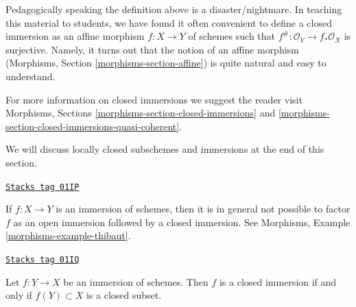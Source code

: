 \medskip\noindent
Pedagogically speaking the definition above is a disaster/nightmare.
In teaching this material to students, we have found it often
convenient to define a closed immersion as an affine morphism
$f : X \to Y$ of schemes such that $f^\# : \mathcal{O}_Y \to f_*\mathcal{O}_X$
is surjective. Namely, it turns out that the notion of an affine
morphism (Morphisms, Section \ref{morphisms-section-affine})
is quite natural and easy to understand.

\medskip\noindent
For more information on closed immersions we suggest the reader visit
Morphisms, Sections \ref{morphisms-section-closed-immersions} and
\ref{morphisms-section-closed-immersions-quasi-coherent}.

\medskip\noindent
We will discuss locally closed subschemes and immersions
at the end of this section.

\begin{remark}
\label{schemes-remark-not-reverse-open-closed}
\href{https://stacks.math.columbia.edu/tag/01IP}{\texttt{Stacks tag 01IP}}

If $f : X \to Y$ is an immersion of schemes, then it is in general
not possible to factor $f$ as an open immersion followed
by a closed immersion. See Morphisms, Example \ref{morphisms-example-thibaut}.
\end{remark}

\begin{lemma}
\label{schemes-lemma-immersion-when-closed}
\href{https://stacks.math.columbia.edu/tag/01IQ}{\texttt{Stacks tag 01IQ}}

Let $f : Y \to X$ be an immersion of schemes. Then $f$ is a closed
immersion if and only if $f(Y) \subset X$ is a closed subset.
\end{lemma}

